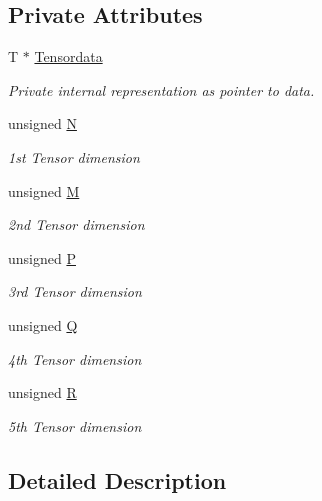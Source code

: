 \subsection*{Private Attributes}
\begin{DoxyCompactItemize}
\item 
T $\ast$ \hyperlink{classoomph_1_1RankFiveTensor_ae93e781da0ba64c2c5403099dc75dd3d}{Tensordata}
\begin{DoxyCompactList}\small\item\em Private internal representation as pointer to data. \end{DoxyCompactList}\item 
unsigned \hyperlink{classoomph_1_1RankFiveTensor_aeea12f3e80605e2c7b6b4a8ec47bf91c}{N}
\begin{DoxyCompactList}\small\item\em 1st Tensor dimension \end{DoxyCompactList}\item 
unsigned \hyperlink{classoomph_1_1RankFiveTensor_a240c4e62ffa0dd3e5dfc3b0063f94c7f}{M}
\begin{DoxyCompactList}\small\item\em 2nd Tensor dimension \end{DoxyCompactList}\item 
unsigned \hyperlink{classoomph_1_1RankFiveTensor_ab23d40bd6af9279e1e35362249c32855}{P}
\begin{DoxyCompactList}\small\item\em 3rd Tensor dimension \end{DoxyCompactList}\item 
unsigned \hyperlink{classoomph_1_1RankFiveTensor_a68d3c3387b64dc8124cb0800ab4814a5}{Q}
\begin{DoxyCompactList}\small\item\em 4th Tensor dimension \end{DoxyCompactList}\item 
unsigned \hyperlink{classoomph_1_1RankFiveTensor_a0c348e8860783caf59103dd86f38d1a6}{R}
\begin{DoxyCompactList}\small\item\em 5th Tensor dimension \end{DoxyCompactList}\end{DoxyCompactItemize}


\subsection{Detailed Description}
